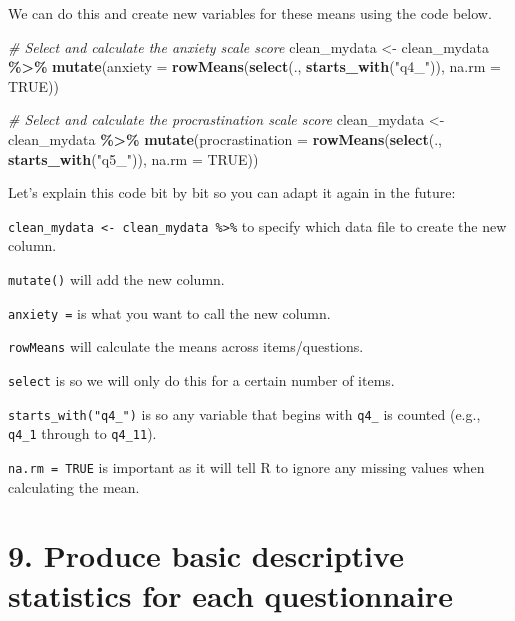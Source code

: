 \documentclass[
]{book}
\newenvironment{Shaded}{\begin{snugshade}}{\end{snugshade}}
\newcommand{\AttributeTok}[1]{\textcolor[rgb]{0.13,0.29,0.53}{#1}}
\newcommand{\CommentTok}[1]{\textcolor[rgb]{0.56,0.35,0.01}{\textit{#1}}}
\newcommand{\ConstantTok}[1]{\textcolor[rgb]{0.56,0.35,0.01}{#1}}
\newcommand{\FunctionTok}[1]{\textcolor[rgb]{0.13,0.29,0.53}{\textbf{#1}}}
\newcommand{\NormalTok}[1]{#1}
\newcommand{\OtherTok}[1]{\textcolor[rgb]{0.56,0.35,0.01}{#1}}
\newcommand{\SpecialCharTok}[1]{\textcolor[rgb]{0.81,0.36,0.00}{\textbf{#1}}}
\newcommand{\StringTok}[1]{\textcolor[rgb]{0.31,0.60,0.02}{#1}}
\let\oldsection\section
\renewcommand{\section}{\needspace{5\baselineskip}\oldsection}
\begin{document}
We can do this and create new variables for these means using the code below.

\begin{Shaded}
\begin{Highlighting}[]
\CommentTok{\# Select and calculate the anxiety scale score}
\NormalTok{clean\_mydata }\OtherTok{\textless{}{-}}\NormalTok{ clean\_mydata }\SpecialCharTok{\%\textgreater{}\%}
  \FunctionTok{mutate}\NormalTok{(}\AttributeTok{anxiety =} \FunctionTok{rowMeans}\NormalTok{(}\FunctionTok{select}\NormalTok{(., }\FunctionTok{starts\_with}\NormalTok{(}\StringTok{"q4\_"}\NormalTok{)), }\AttributeTok{na.rm =} \ConstantTok{TRUE}\NormalTok{))}

\CommentTok{\# Select and calculate the procrastination scale score}
\NormalTok{clean\_mydata }\OtherTok{\textless{}{-}}\NormalTok{ clean\_mydata }\SpecialCharTok{\%\textgreater{}\%}
  \FunctionTok{mutate}\NormalTok{(}\AttributeTok{procrastination =} \FunctionTok{rowMeans}\NormalTok{(}\FunctionTok{select}\NormalTok{(., }\FunctionTok{starts\_with}\NormalTok{(}\StringTok{"q5\_"}\NormalTok{)), }\AttributeTok{na.rm =} \ConstantTok{TRUE}\NormalTok{))}
\end{Highlighting}
\end{Shaded}

Let's explain this code bit by bit so you can adapt it again in the future:

\texttt{clean\_mydata\ \textless{}-\ clean\_mydata\ \%\textgreater{}\%} to specify which data file to create the new column.

\texttt{mutate()} will add the new column.

\texttt{anxiety\ =} is what you want to call the new column.

\texttt{rowMeans} will calculate the means across items/questions.

\texttt{select} is so we will only do this for a certain number of items.

\texttt{starts\_with("q4\_")} is so any variable that begins with \texttt{q4\_} is counted (e.g., \texttt{q4\_1} through to \texttt{q4\_11}).

\texttt{na.rm\ =\ TRUE} is important as it will tell R to ignore any missing values when calculating the mean.

\section{\texorpdfstring{\textbf{9. Produce basic descriptive statistics for each questionnaire}}{9. Produce basic descriptive statistics for each questionnaire}}\label{produce-basic-descriptive-statistics-for-each-questionnaire}
\end{document}
